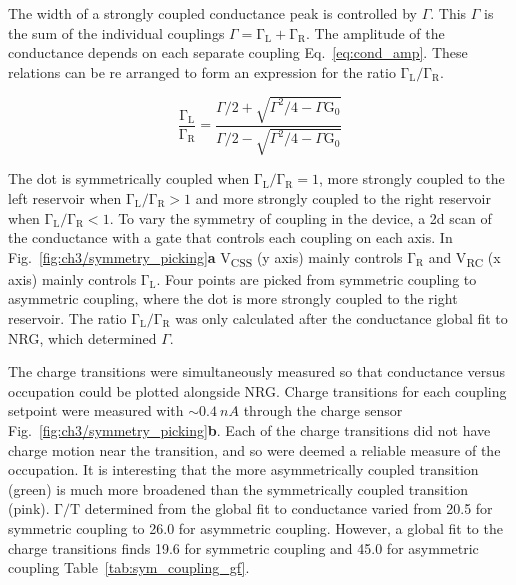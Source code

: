 The width of a strongly coupled conductance peak is controlled by $\Gamma$. This $\Gamma$ is the sum of the individual couplings $\Gamma=\mathrm{\Gamma_L} + \mathrm{\Gamma_R}$. The amplitude of the conductance depends on each separate coupling Eq.~\ref{eq:cond_amp}. These relations can be re arranged to form an expression for the ratio $\mathrm{\Gamma_L}/\mathrm{\Gamma_R}$.


\begin{equation}\label{eq:cond_ratio}
  \frac{\mathrm{\Gamma_L}}{\mathrm{\Gamma_R}} = 
  \frac
  {\Gamma/2 + \sqrt{\Gamma^2/4 - \Gamma\mathrm{G_0}}}
  {\Gamma/2 - \sqrt{\Gamma^2/4 - \Gamma\mathrm{G_0}}}
\end{equation}

The dot is symmetrically coupled when $\mathrm{\Gamma_L}/\mathrm{\Gamma_R} = 1$, more strongly coupled to the left reservoir when $\mathrm{\Gamma_L}/\mathrm{\Gamma_R} > 1$ and more strongly coupled to the right reservoir when $\mathrm{\Gamma_L}/\mathrm{\Gamma_R} < 1$. To vary the symmetry of coupling in the device, a 2d scan of the conductance with a gate that controls each coupling on each axis.  In Fig.~\ref{fig:ch3/symmetry_picking}\textbf{a} V\textsubscript{CSS} (y axis) mainly controls $\mathrm{\Gamma_R}$ and  V\textsubscript{RC} (x axis) mainly controls $\mathrm{\Gamma_L}$. Four points are picked from symmetric coupling to asymmetric coupling, where the dot is more strongly coupled to the right reservoir. The ratio $\mathrm{\Gamma_L}/\mathrm{\Gamma_R}$ was only calculated after the conductance global fit to NRG, which determined $\Gamma$. 

The charge transitions were simultaneously measured so that conductance versus occupation could be plotted alongside NRG. Charge transitions for each coupling setpoint were measured with $\sim\qty{0.4}{nA}$ through the charge sensor Fig.~\ref{fig:ch3/symmetry_picking}\textbf{b}. Each of the charge transitions did not have charge motion near the transition, and so were deemed a reliable measure of the occupation. It is interesting that the more asymmetrically coupled transition (green) is much more broadened than the symmetrically coupled transition (pink). $\mathrm{\Gamma/T}$ determined from the global fit to conductance varied from 20.5 for symmetric coupling to 26.0 for asymmetric coupling. However, a global fit to the charge transitions finds 19.6 for symmetric coupling and 45.0 for asymmetric coupling Table~\ref{tab:sym_coupling_gf}. 

